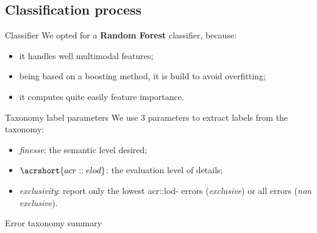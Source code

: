 \documentclass[export]{beamer}
\begin{document}
        \subsection{Classification process}
            \begin{frame}{Classifier}
                We opted for a \textbf{Random Forest} classifier, because:
                \begin{itemize}[label=$\blacktriangleright$, font=\color{IGNGreen}]
                    \item<1-> it handles well multimodal features;
                    \item<2-> being based on a boosting method, it is build to avoid overfitting;
                    \item<3-> it computes quite easily feature importance.
                \end{itemize}
            \end{frame}
            \begin{frame}{Taxonomy label parameters}
                We use $3$ parameters to extract labels from the taxonomy:
                \begin{itemize}[label=$\blacktriangleright$, font=\color{IGNGreen}]
                    \item<1-> \emph{finesse}: the semantic level desired;
                    \item<2-> $\acrshort{acr::elod}$: the evaluation level of details;
                    \item<3-> \emph{exclusivity}: report only the lowest \acrshort{acr::lod}- errors (\emph{exclusive}) or all errors (\emph{non exclusive}).
                \end{itemize}
            \end{frame}
            \begin{frame}{Error taxonomy summary}
                \begin{figure}
                    
                \end{figure}
            \end{frame}
\end{document}
